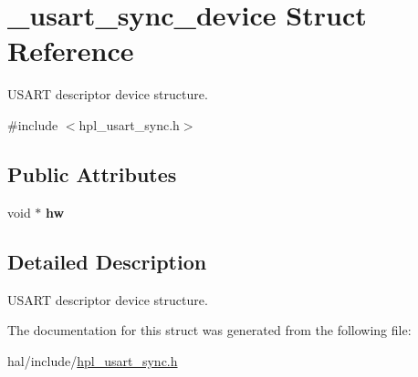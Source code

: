 \hypertarget{struct__usart__sync__device}{}\section{\+\_\+usart\+\_\+sync\+\_\+device Struct Reference}
\label{struct__usart__sync__device}


U\+S\+A\+RT descriptor device structure.  




{\ttfamily \#include $<$hpl\+\_\+usart\+\_\+sync.\+h$>$}

\subsection*{Public Attributes}
\begin{DoxyCompactItemize}
\item 
\mbox{\label{struct__usart__sync__device_a299ec1be7b3e3f53a8f8921823a3480c}} 
void $\ast$ {\bfseries hw}
\end{DoxyCompactItemize}


\subsection{Detailed Description}
U\+S\+A\+RT descriptor device structure. 

The documentation for this struct was generated from the following file\+:\begin{DoxyCompactItemize}
\item 
hal/include/\hyperlink{hpl__usart__sync_8h}{hpl\+\_\+usart\+\_\+sync.\+h}\end{DoxyCompactItemize}

